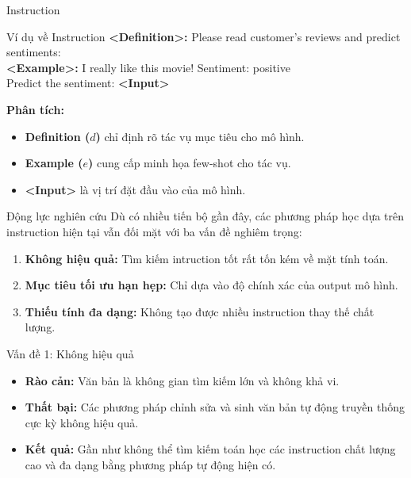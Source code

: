 \documentclass[12pt,xcolor=table]{beamer}
\begin{document}
\begin{frame}{Instruction}

    \begin{block}{Ví dụ về Instruction}
        \textbf{<Definition>:} Please read customer's reviews and predict sentiments: \\
        \textbf{<Example>:} I really like this movie! Sentiment: positive \\
        Predict the sentiment: \textbf{<Input>}
    \end{block}

    \vspace{0.3cm}
    \textbf{Phân tích:}
    \begin{itemize}
        \item \textbf{Definition ($d$)} chỉ định rõ tác vụ mục tiêu cho mô hình.
        \item \textbf{Example ($e$)} cung cấp minh họa few-shot cho tác vụ.
        \item \textbf{<Input>} là vị trí đặt đầu vào của mô hình.
    \end{itemize}
\end{frame}

\begin{frame}{Động lực nghiên cứu}
    Dù có nhiều tiến bộ gần đây, các phương pháp học dựa trên instruction hiện tại vẫn đối mặt với ba vấn đề nghiêm trọng:
    \vspace{0.5cm}
    \begin{enumerate}
        \item \textbf{Không hiệu quả:} Tìm kiếm intruction tốt rất tốn kém về mặt tính toán.
        \item \textbf{Mục tiêu tối ưu hạn hẹp:} Chỉ dựa vào độ chính xác của output mô hình.
        \item \textbf{Thiếu tính đa dạng:} Không tạo được nhiều instruction thay thế chất lượng.
    \end{enumerate}
\end{frame}

\begin{frame}{Vấn đề 1: Không hiệu quả}
    \begin{itemize}
        \item \textbf{Rào cản:} Văn bản là không gian tìm kiếm lớn và không khả vi.
        \item \textbf{Thất bại:} Các phương pháp chỉnh sửa và sinh văn bản tự động truyền thống cực kỳ không hiệu quả.
        \item \textbf{Kết quả:} Gần như không thể tìm kiếm toán học các instruction chất lượng cao và đa dạng bằng phương pháp tự động hiện có.
    \end{itemize}
\end{frame}
\end{document}
